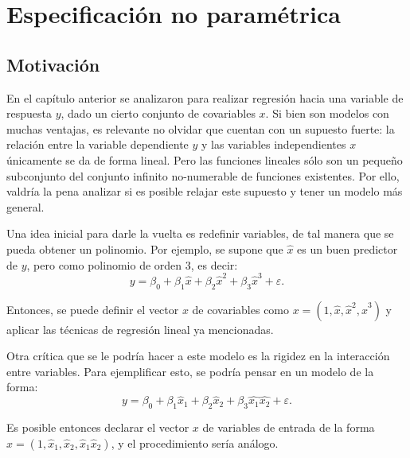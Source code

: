 \chapter[Especificaci\'on no param\'etrica]{Especificaci\'on no param\'etrica}

\section{Motivaci\'on}

En el cap\'itulo anterior se analizaron para realizar regresi\'on hacia una variable de respuesta $y$, dado un cierto conjunto de covariables $x$. Si bien son modelos con muchas ventajas, es relevante no olvidar que cuentan con un supuesto fuerte: la relación entre la variable dependiente $y$ y las variables independientes $x$ \'unicamente se da de forma lineal. Pero las funciones lineales s\'olo son un pequeño subconjunto del conjunto infinito no-numerable de funciones existentes. Por ello, valdr\'ia la pena analizar si es posible relajar este supuesto y tener un modelo m\'as general.

Una idea inicial para darle la vuelta es redefinir variables, de tal manera que se pueda obtener un polinomio. Por ejemplo, se supone que $\hat{x}$ es un buen predictor de $y$, pero como polinomio de orden 3, es decir:
\begin{equation*}
    y = \beta_0 + \beta_1\hat{x} + \beta_2\hat{x}^2 + \beta_3\hat{x}^3 + \varepsilon.
\end{equation*}

Entonces, se puede definir el vector $x$ de covariables como $x = (1,\hat{x},\hat{x}^2,\hat{x}^3)$ y aplicar las t\'ecnicas de regresi\'on lineal ya mencionadas.

Otra cr\'itica que se le podr\'ia hacer a este modelo es la rigidez en la interacci\'on entre variables. Para ejemplificar esto, se podr\'ia pensar en un modelo de la forma:
\begin{equation*}
    y = \beta_0 + \beta_1\hat{x}_1 + \beta_2\hat{x}_2 + \beta_3\hat{x_1}\hat{x_2} + \varepsilon.
\end{equation*}

Es posible entonces declarar el vector $x$ de variables de entrada de la forma $x = (1,\hat{x}_1,\hat{x}_2,\hat{x}_1\hat{x}_2)$, y el procedimiento ser\'ia an\'alogo.

